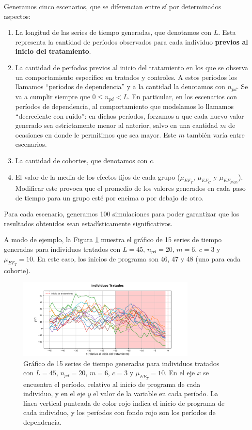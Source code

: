 \documentclass[../../main.tex]{subfiles}
\begin{document}
Generamos cinco escenarios, que se diferencian entre sí por determinados aspectos:
\begin{enumerate}[itemsep=0.05cm, label=\textbf{\arabic*.}]
    \item La longitud de las series de tiempo generadas, que denotamos con \(L\). Esta
    representa la cantidad de períodos observados para cada individuo \textbf{previos al inicio
    del tratamiento}.
    \item La cantidad de períodos previos al inicio del tratamiento en los que se observa
    un comportamiento específico en tratados y controles. A estos períodos los llamamos
    ``períodos de dependencia'' y a la cantidad la denotamos con \(n_{pd}\). Se
    va a cumplir siempre que \(0 \le n_{pd} < L\). En particular, en los
    escenarios con períodos de dependencia, al comportamiento que modelamos lo llamamos
    ``decreciente con ruido'': en dichos períodos, forzamos a que cada nuevo valor
    generado sea estrictamente menor al anterior, salvo en una cantidad \(m\) de ocasiones
    en donde le permitimos que sea mayor. Este \(m\) también varía entre escenarios.
    \item La cantidad de cohortes, que denotamos con \(c\).
    \item El valor de la media de los efectos fijos de cada grupo (\(\mu_{EF_T}\),
    \(\mu_{EF_C}\) y \(\mu_{EF_{NiNi}}\)). Modificar este provoca que el promedio de los
    valores generados en cada paso de tiempo para un grupo esté por encima o por debajo de
    otro.
\end{enumerate}
Para cada escenario, generamos 100 simulaciones para poder garantizar que los resultados
obtenidos sean estadísticamente significativos.

A modo de ejemplo, la Figura \ref{fig:treated_series_example} muestra el gráfico de 15
series de tiempo generadas para individuos tratados con \(L=45\), \(n_{pd}=20\), \(m=6\),
\(c=3\) y \(\mu_{EF_T} = 10\). En este caso, los inicios de programa son 46, 47 y 48 (uno
para cada cohorte).

\begin{figure}[h!]
    \centering
    \includegraphics[width=0.8\textwidth]{figs/series_tratados_exp1.png}
    \caption{Gráfico de 15 series de tiempo generadas para individuos tratados con
    \(L=45\), \(n_{pd}=20\), \(m=6\), \(c=3\) y \(\mu_{EF_T} = 10\). En el eje \(x\) se
    encuentra el período, relativo al inicio de programa de cada individuo, y en el eje
    \(y\) el valor de la variable en cada período. La línea vertical punteada de color
    rojo indica el inicio de programa de cada individuo, y los períodos con fondo rojo son
    los períodos de dependencia.}
    \label{fig:treated_series_example}
\end{figure}
\end{document}
